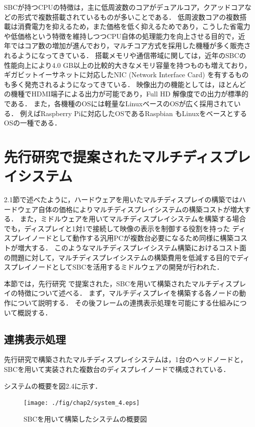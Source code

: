 SBCが持つCPUの特徴は，主に低周波数のコアがデュアルコア，クアッドコアなどの形式で複数搭載されているものが多いことである．
低周波数コアの複数搭載は消費電力を抑えるため，また価格を低く抑えるためであり，こうした省電力や低価格という特徴を維持しつつCPU自体の処理能力を向上させる目的で，近年ではコア数の増加が進んでおり，マルチコア方式を採用した機種が多く販売されるようになってきている．
搭載メモリや通信帯域に関しては，近年のSBCの性能向上により4.0 GB以上の比較的大きなメモリ容量を持つものも増えており，ギガビットイーサネットに対応したNIC (Network Interface Card) を有するものも多く発売されるようになってきている．
映像出力の機能としては，ほとんどの機種でHDMI端子による出力が可能であり，Full HD 解像度での出力が標準的である．
また，各機種のOSには軽量なLinuxベースのOSが広く採用されている．
例えばRaspberry Piに対応したOSであるRaspbian \cite{raspbian}もLinuxをベースとするOSの一種である．



\section{先行研究で提案されたマルチディスプレイシステム}

2.1節で述べたように，ハードウェアを用いたマルチディスプレイの構築ではハードウェア自体の価格によりマルチディスプレイシステムの構築コストが増大する．
また，ミドルウェアを用いてマルチディスプレイシステムを構築する場合でも，ディスプレイと1対1で接続して映像の表示を制御する役割を持った
ディスプレイノードとして動作する汎用PCが複数台必要になるため同様に構築コストが増大する．
このようなマルチディスプレイシステム構築におけるコスト面の問題に対して，マルチディスプレイシステムの構築費用を低減する目的でディスプレイノードとしてSBCを活用するミドルウェアの開発が行われた．

本節では，先行研究 \cite{Ishida}で提案された，SBCを用いて構築されたマルチディスプレイの特徴について述べる．
まず，マルチディスプレイを構築する各ノードの動作について説明する．
その後フレームの連携表示処理を可能にする仕組みについて概説する．

\subsection*{連携表示処理}

先行研究で構築されたマルチディスプレイシステムは，1台のヘッドノードと，SBCを用いて実装された複数台のディスプレイノードで構成されている．

システムの概要を図2.4に示す．

\begin{figure}[H]
  \hspace*{\fill}
  \texttt{[image: ./fig/chap2/system\_4.eps]}
  \hspace*{\fill}
  \label{fig_2.4}
  \caption{SBCを用いて構築したシステムの概要図}
 \end{figure}

